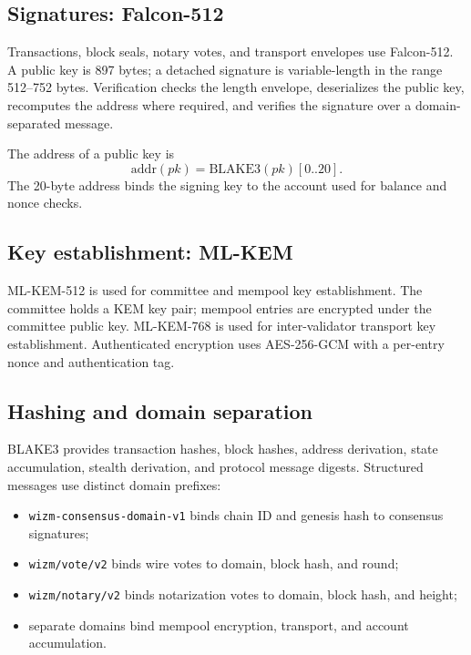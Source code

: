\documentclass[11pt,a4paper]{article}
\begin{document}
\subsection{Signatures: Falcon-512}

Transactions, block seals, notary votes, and transport envelopes use
Falcon-512. A public key is 897 bytes; a detached signature is variable-length
in the range 512--752 bytes. Verification checks the length envelope,
deserializes the public key, recomputes the address where required, and
verifies the signature over a domain-separated message.

The address of a public key is
\begin{equation}
  \mathrm{addr}(pk) = \mathrm{BLAKE3}(pk)[0..20].
\end{equation}
The 20-byte address binds the signing key to the account used for balance and
nonce checks.

\subsection{Key establishment: ML-KEM}

ML-KEM-512 is used for committee and mempool key establishment. The committee
holds a KEM key pair; mempool entries are encrypted under the committee public
key. ML-KEM-768 is used for inter-validator transport key establishment.
Authenticated encryption uses AES-256-GCM with a per-entry nonce and
authentication tag.

\subsection{Hashing and domain separation}

BLAKE3 provides transaction hashes, block hashes, address derivation, state
accumulation, stealth derivation, and protocol message digests. Structured
messages use distinct domain prefixes:
\begin{itemize}[leftmargin=*]
  \item \texttt{wizm-consensus-domain-v1} binds chain ID and genesis hash to
        consensus signatures;
  \item \texttt{wizm/vote/v2} binds wire votes to domain, block hash, and
        round;
  \item \texttt{wizm/notary/v2} binds notarization votes to domain, block
        hash, and height;
  \item separate domains bind mempool encryption, transport, and account
        accumulation.
\end{itemize}
\end{document}
